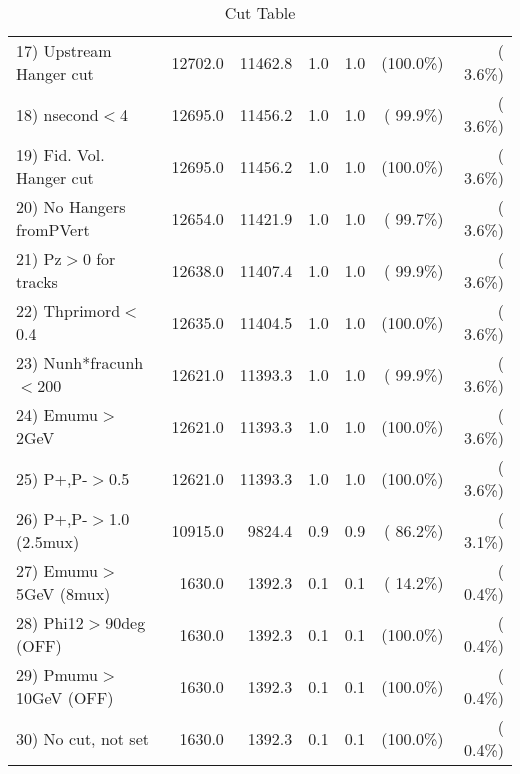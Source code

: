\begin{table}[h!]
\begin{tabular}{||l||r|r|r|r|r|r||}
 17) Upstream Hanger cut  &      12702.0 &      11462.8 &          1.0 &          1.0 & (100.0\%) & (  3.6\%) \\
 18) nsecond$<$4          &      12695.0 &      11456.2 &          1.0 &          1.0 & ( 99.9\%) & (  3.6\%) \\
 19) Fid. Vol. Hanger cut &      12695.0 &      11456.2 &          1.0 &          1.0 & (100.0\%) & (  3.6\%) \\
 20) No Hangers fromPVert &      12654.0 &      11421.9 &          1.0 &          1.0 & ( 99.7\%) & (  3.6\%) \\
 21) Pz$>$0 for tracks    &      12638.0 &      11407.4 &          1.0 &          1.0 & ( 99.9\%) & (  3.6\%) \\
 22) Thprimord$<$0.4      &      12635.0 &      11404.5 &          1.0 &          1.0 & (100.0\%) & (  3.6\%) \\
 23) Nunh*fracunh$<$200   &      12621.0 &      11393.3 &          1.0 &          1.0 & ( 99.9\%) & (  3.6\%) \\
 24) Emumu$>$2GeV         &      12621.0 &      11393.3 &          1.0 &          1.0 & (100.0\%) & (  3.6\%) \\
 25) P+,P-$>$0.5          &      12621.0 &      11393.3 &          1.0 &          1.0 & (100.0\%) & (  3.6\%) \\
 26) P+,P-$>$1.0 (2.5mux) &      10915.0 &       9824.4 &          0.9 &          0.9 & ( 86.2\%) & (  3.1\%) \\
 27) Emumu$>$5GeV  (8mux) &       1630.0 &       1392.3 &          0.1 &          0.1 & ( 14.2\%) & (  0.4\%) \\
 28) Phi12$>$90deg  (OFF) &       1630.0 &       1392.3 &          0.1 &          0.1 & (100.0\%) & (  0.4\%) \\
 29) Pmumu$>$10GeV  (OFF) &       1630.0 &       1392.3 &          0.1 &          0.1 & (100.0\%) & (  0.4\%) \\
 30) No cut, not set      &       1630.0 &       1392.3 &          0.1 &          0.1 & (100.0\%) & (  0.4\%) \\
 \hline
 \hline
 \end{tabular}
 \caption{Cut Table           }
 \label{tab-cutcohjpsi-mumu_jpsi}
 \end{table}
